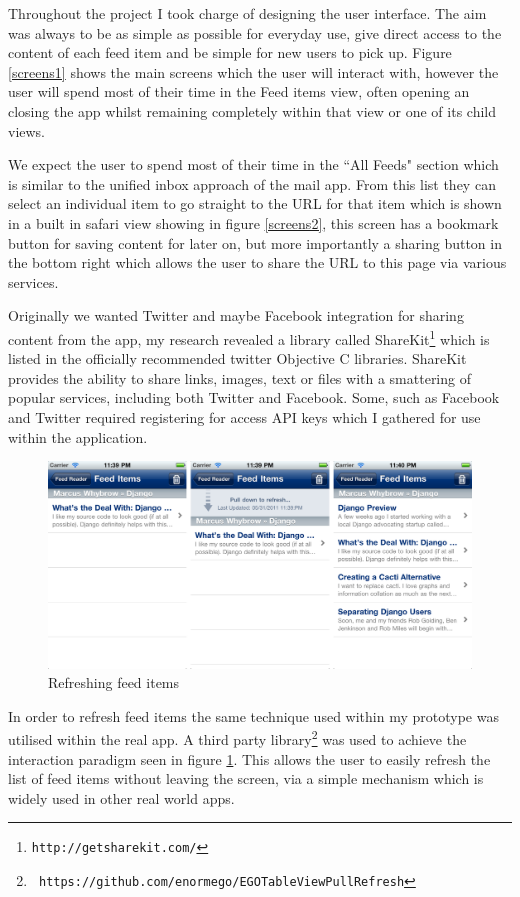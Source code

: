 \documentclass[a4paper,11pt]{article}
\begin{document}
	Throughout the project I took charge of designing the user interface. The
	aim was always to be as simple as possible for everyday use, give direct
	access to the content of each feed item and be simple for new users to
	pick up. Figure \ref{screens1} shows the main screens which the user will
	interact with, however the user will spend most of their time in the Feed
	items view, often opening an closing the app whilst remaining completely
	within that view or one of its child views.
	
	We expect the user to spend most of their time in the ``All Feeds" section
	which is similar to the unified inbox approach of the mail app. From this
	list they can select an individual item to go straight to the URL for that
	item which is shown in a built in safari view showing in figure
	\ref{screens2}, this screen has a bookmark button for saving content for
	later on, but more importantly a sharing button in the bottom right which
	allows the user to share the URL to this page via various services.
	
	Originally we wanted Twitter and maybe Facebook integration for sharing
	content from the app, my research revealed a library called
	ShareKit\footnote{\texttt{http://getsharekit.com/}} which is listed in the
	officially recommended twitter Objective C libraries. ShareKit provides
	the ability to share links, images, text or files with a smattering of
	popular services, including both Twitter and Facebook. Some, such as
	Facebook and Twitter required registering for access API keys which I
	gathered for use within the application.
	
	\begin{figure}[t]
		\centering
		\includegraphics[width=12.65cm]{images/screens3.png}
		\caption{Refreshing feed items}
		\label{screens3}
	\end{figure}
	
	In order to refresh feed items the same technique used within my prototype
	was utilised within the real app. A third party
	library\footnote{\texttt{
	https://github.com/enormego/EGOTableViewPullRefresh}} was used to achieve
	the interaction paradigm seen in figure \ref{screens3}. This allows the
	user to easily refresh the list of feed items without leaving the screen,
	via a simple mechanism which is widely used in other real world apps.
	
\end{document}
